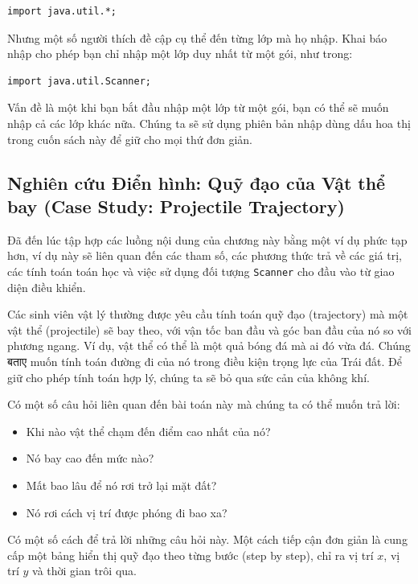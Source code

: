 \begin{verbatim}
import java.util.*;
\end{verbatim}

Nhưng một số người thích đề cập cụ thể đến từng lớp mà họ nhập. Khai báo
nhập cho phép bạn chỉ nhập một lớp duy nhất từ một gói, như trong:

\begin{verbatim}
import java.util.Scanner;
\end{verbatim}

Vấn đề là một khi bạn bắt đầu nhập một lớp từ một gói, bạn có thể sẽ
muốn nhập cả các lớp khác nữa. Chúng ta sẽ sử dụng phiên bản nhập dùng
dấu hoa thị trong cuốn sách này để giữ cho mọi thứ đơn giản.

\subsection{Nghiên cứu Điển hình: Quỹ đạo của Vật thể bay (Case
Study: Projectile
Trajectory)}\label{nghiuxean-cux1ee9u-ux111iux1ec3n-huxecnh-quux1ef9-ux111ux1ea1o-cux1ee7a-vux1eadt-thux1ec3-bay-case-study-projectile-trajectory}

Đã đến lúc tập hợp các luồng nội dung của chương này bằng một ví dụ phức
tạp hơn, ví dụ này sẽ liên quan đến các tham số, các phương thức trả về
các giá trị, các tính toán toán học và việc sử dụng đối tượng
\texttt{Scanner} cho đầu vào từ giao diện điều khiển.

Các sinh viên vật lý thường được yêu cầu tính toán quỹ đạo (trajectory)
mà một vật thể (projectile) sẽ bay theo, với vận tốc ban đầu và góc ban
đầu của nó so với phương ngang. Ví dụ, vật thể có thể là một quả bóng đá
mà ai đó vừa đá. Chúng बताए muốn tính toán đường đi của nó trong điều
kiện trọng lực của Trái đất. Để giữ cho phép tính toán hợp lý, chúng ta
sẽ bỏ qua sức cản của không khí.

Có một số câu hỏi liên quan đến bài toán này mà chúng ta có thể muốn trả
lời:

\begin{itemize}
\tightlist
\item
  Khi nào vật thể chạm đến điểm cao nhất của nó?
\item
  Nó bay cao đến mức nào?
\item
  Mất bao lâu để nó rơi trở lại mặt đất?
\item
  Nó rơi cách vị trí được phóng đi bao xa?
\end{itemize}

Có một số cách để trả lời những câu hỏi này. Một cách tiếp cận đơn giản
là cung cấp một bảng hiển thị quỹ đạo theo từng bước (step by step), chỉ
ra vị trí \(x\), vị trí \(y\) và thời gian trôi qua.

